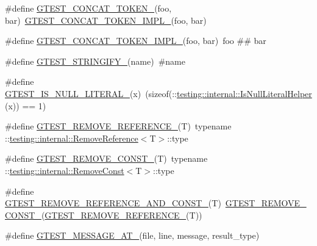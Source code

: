 \begin{DoxyCompactItemize}
\item 
\#define \mbox{\hyperlink{gtest-internal_8h_ae3c336cbe1ae2bd1b1d019333e4428a0}{G\+T\+E\+S\+T\+\_\+\+C\+O\+N\+C\+A\+T\+\_\+\+T\+O\+K\+E\+N\+\_\+}}(foo,  bar)~\mbox{\hyperlink{gtest-internal_8h_aa39fb5346d3573feebe4257cb3a01fde}{G\+T\+E\+S\+T\+\_\+\+C\+O\+N\+C\+A\+T\+\_\+\+T\+O\+K\+E\+N\+\_\+\+I\+M\+P\+L\+\_\+}}(foo, bar)
\item 
\#define \mbox{\hyperlink{gtest-internal_8h_aa39fb5346d3573feebe4257cb3a01fde}{G\+T\+E\+S\+T\+\_\+\+C\+O\+N\+C\+A\+T\+\_\+\+T\+O\+K\+E\+N\+\_\+\+I\+M\+P\+L\+\_\+}}(foo,  bar)~foo \#\# bar
\item 
\#define \mbox{\hyperlink{gtest-internal_8h_affa935d4361fa573644e9c739dde2b14}{G\+T\+E\+S\+T\+\_\+\+S\+T\+R\+I\+N\+G\+I\+F\+Y\+\_\+}}(name)~\#name
\item 
\#define \mbox{\hyperlink{gtest-internal_8h_ae5dd8e23090e08856613878fa1ff6fca}{G\+T\+E\+S\+T\+\_\+\+I\+S\+\_\+\+N\+U\+L\+L\+\_\+\+L\+I\+T\+E\+R\+A\+L\+\_\+}}(x)~(sizeof(\+::\mbox{\hyperlink{namespacetesting_1_1internal_afb0731ba39ffef1fa1730ac0699c9025}{testing\+::internal\+::\+Is\+Null\+Literal\+Helper}}(x)) == 1)
\item 
\#define \mbox{\hyperlink{gtest-internal_8h_a84c72f25a6a6600e3ff8381ca6982ae9}{G\+T\+E\+S\+T\+\_\+\+R\+E\+M\+O\+V\+E\+\_\+\+R\+E\+F\+E\+R\+E\+N\+C\+E\+\_\+}}(T)~typename \+::\mbox{\hyperlink{structtesting_1_1internal_1_1RemoveReference}{testing\+::internal\+::\+Remove\+Reference}}$<$T$>$\+::type
\item 
\#define \mbox{\hyperlink{gtest-internal_8h_a2ffec8c60510eb130af387f5ce9a756a}{G\+T\+E\+S\+T\+\_\+\+R\+E\+M\+O\+V\+E\+\_\+\+C\+O\+N\+S\+T\+\_\+}}(T)~typename \+::\mbox{\hyperlink{structtesting_1_1internal_1_1RemoveConst}{testing\+::internal\+::\+Remove\+Const}}$<$T$>$\+::type
\item 
\#define \mbox{\hyperlink{gtest-internal_8h_a874567b176266188fabfffb8393267ce}{G\+T\+E\+S\+T\+\_\+\+R\+E\+M\+O\+V\+E\+\_\+\+R\+E\+F\+E\+R\+E\+N\+C\+E\+\_\+\+A\+N\+D\+\_\+\+C\+O\+N\+S\+T\+\_\+}}(T)~\mbox{\hyperlink{gtest-internal_8h_a2ffec8c60510eb130af387f5ce9a756a}{G\+T\+E\+S\+T\+\_\+\+R\+E\+M\+O\+V\+E\+\_\+\+C\+O\+N\+S\+T\+\_\+}}(\mbox{\hyperlink{gtest-internal_8h_a84c72f25a6a6600e3ff8381ca6982ae9}{G\+T\+E\+S\+T\+\_\+\+R\+E\+M\+O\+V\+E\+\_\+\+R\+E\+F\+E\+R\+E\+N\+C\+E\+\_\+}}(T))
\item 
\#define \mbox{\hyperlink{gtest-internal_8h_a8d70025c45a47a493780746dfd66d565}{G\+T\+E\+S\+T\+\_\+\+M\+E\+S\+S\+A\+G\+E\+\_\+\+A\+T\+\_\+}}(file,  line,  message,  result\+\_\+type)

\end{DoxyCompactItemize}
